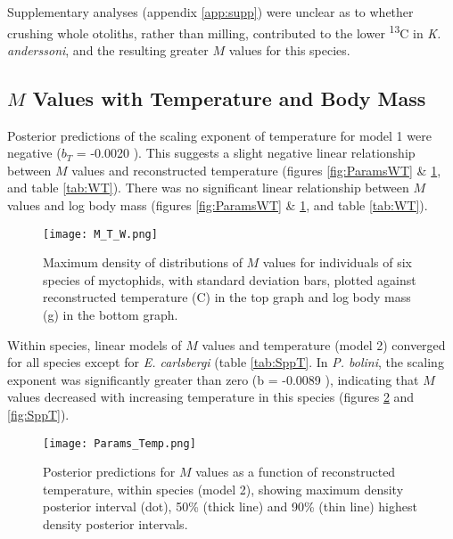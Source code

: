 \documentclass[12pt, titlepage]{article}
\begin{document}
Supplementary analyses (appendix \ref{app:supp}) %
were unclear as to whether crushing whole otoliths, rather than milling, contributed to the lower \textdelta \textsuperscript{13}C in \textit{K. anderssoni}, and the resulting greater $M$ values for this species.

\subsection{$M$ Values with Temperature and Body Mass}

Posterior predictions of the scaling exponent of temperature for model 1 were negative ($b_{T}$ = -0.0020 ).
This suggests a slight negative linear relationship between $M$ values and reconstructed temperature (figures \ref{fig:ParamsWT} \& \ref{fig:WT}, and table \ref{tab:WT}).
There was no significant linear relationship between $M$ values and log body mass (figures \ref{fig:ParamsWT} \& \ref{fig:WT}, and table \ref{tab:WT}).

\clearpage
\begin{figure}[H]
\texttt{[image: M\_T\_W.png]}
\caption{Maximum density of distributions of $M$ values for individuals of six species of myctophids, with standard deviation bars, plotted against reconstructed temperature (\textdegree C) in the top graph and log body mass (g) in the bottom graph.}
\label{fig:WT}
\end{figure}

Within species, linear models of $M$ values and temperature (model 2) converged for all species except for \textit{E. carlsbergi} (table \ref{tab:SppT}.
In \textit{P. bolini}, the scaling exponent was significantly greater than zero (b = -0.0089 ), indicating that $M$ values decreased with increasing temperature in this species (figures \ref{fig:ParamsT} and \ref{fig:SppT}).

\begin{figure}[H]
\texttt{[image: Params\_Temp.png]}
\caption{Posterior predictions for $M$ values as a function of reconstructed temperature, within species (model 2), showing maximum density posterior interval (dot), 50\% (thick line) and 90\% (thin line) highest density posterior intervals.}
\label{fig:ParamsT}
\end{figure}
\end{document}

